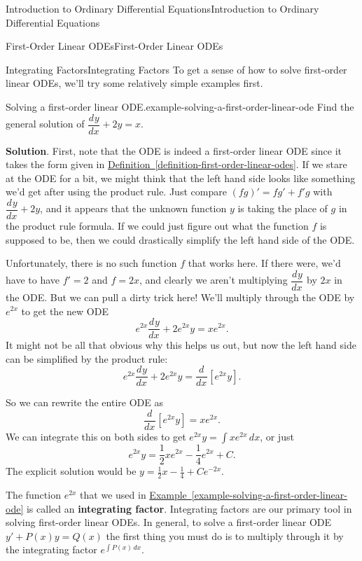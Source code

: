 \documentclass[10pt,]{book}
\newcommand{\terminology}[1]{\textbf{#1}}
\numberwithin{equation}{section}
\newcommand{\dv}[3][]{\dfrac{d^{#1} #2}{d #3^{#1}}}
\begin{document}
\begin{chapterptx}{Introduction to Ordinary Differential Equations}{}{Introduction to Ordinary Differential Equations}{}{}
\begin{sectionptx}{First-Order Linear ODEs}{}{First-Order Linear ODEs}{}{}
\begin{subsectionptx}{Integrating Factors}{}{Integrating Factors}{}{}
\hypertarget{p-75}{}%
To get a sense of how to solve first-order linear ODEs, we'll try some relatively simple examples first.%
\begin{example}{Solving a first-order linear ODE.}{example-solving-a-first-order-linear-ode}%
\hypertarget{p-76}{}%
Find the general solution of \(\dv{y}{x}+2y = x\).%
\par\smallskip%
\noindent\textbf{Solution}.\hypertarget{solution-13}{}\quad%
\hypertarget{p-77}{}%
First, note that the ODE is indeed a first-order linear ODE since it takes the form given in \hyperref[definition-first-order-linear-odes]{Definition~\ref{definition-first-order-linear-odes}}. If we stare at the ODE for a bit, we might think that the left hand side looks like something we'd get after using the product rule. Just compare \((fg)' = fg'+f'g\) with \(\dv{y}{x}+2y\), and it appears that the unknown function \(y\) is taking the place of \(g\) in the product rule formula. If we could just figure out what the function \(f\) is supposed to be, then we could drastically simplify the left hand side of the ODE.%
\par
\hypertarget{p-78}{}%
Unfortunately, there is no such function \(f\) that works here. If there were, we'd have to have \(f'=2\) and \(f=2x\), and clearly we aren't multiplying \(\dv{y}{x}\) by \(2x\) in the ODE. But we can pull a dirty trick here! We'll multiply through the ODE by \(e^{2x}\) to get the new ODE%
\begin{equation*}
e^{2x}\dv{y}{x}+2e^{2x}y = xe^{2x}.
\end{equation*}
It might not be all that obvious why this helps us out, but now the left hand side can be simplified by the product rule:%
\begin{equation*}
e^{2x}\dv{y}{x}+2e^{2x}y = \dv{}{x}[e^{2x}y].
\end{equation*}
%
\par
\hypertarget{p-79}{}%
So we can rewrite the entire ODE as%
\begin{equation*}
\dv{}{x}[e^{2x}y] = xe^{2x}.
\end{equation*}
We can integrate this on both sides to get \(e^{2x}y = \int xe^{2x}\,dx\), or just%
\begin{equation*}
e^{2x}y = \frac{1}{2}xe^{2x} - \frac{1}{4}e^{2x}+C.
\end{equation*}
The explicit solution would be \(y = \frac{1}{2}x - \frac{1}{4} + Ce^{-2x}\).%
\end{example}
\hypertarget{p-80}{}%
The function \(e^{2x}\) that we used in \hyperref[example-solving-a-first-order-linear-ode]{Example~\ref{example-solving-a-first-order-linear-ode}} is called an \terminology{integrating factor}. Integrating factors are our primary tool in solving first-order linear ODEs. In general, to solve a first-order linear ODE \(y' +P(x)y=Q(x)\) the first thing you must do is to multiply through it by the integrating factor \(e^{\int P(x)\,dx}\).%

\end{subsectionptx}
\end{sectionptx}
\end{chapterptx}
\end{document}
